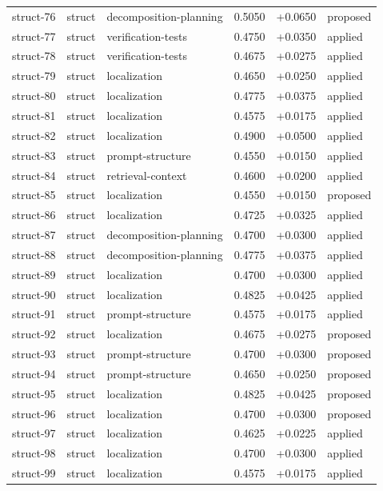 \begin{center}
\begin{longtable}{llp{5.2cm}rrl}
struct-76 & struct & decomposition-planning & 0.5050 & +0.0650 & proposed \\
struct-77 & struct & verification-tests & 0.4750 & +0.0350 & applied \\
struct-78 & struct & verification-tests & 0.4675 & +0.0275 & applied \\
struct-79 & struct & localization & 0.4650 & +0.0250 & applied \\
struct-80 & struct & localization & 0.4775 & +0.0375 & applied \\
struct-81 & struct & localization & 0.4575 & +0.0175 & applied \\
struct-82 & struct & localization & 0.4900 & +0.0500 & applied \\
struct-83 & struct & prompt-structure & 0.4550 & +0.0150 & applied \\
struct-84 & struct & retrieval-context & 0.4600 & +0.0200 & applied \\
struct-85 & struct & localization & 0.4550 & +0.0150 & proposed \\
struct-86 & struct & localization & 0.4725 & +0.0325 & applied \\
struct-87 & struct & decomposition-planning & 0.4700 & +0.0300 & applied \\
struct-88 & struct & decomposition-planning & 0.4775 & +0.0375 & applied \\
struct-89 & struct & localization & 0.4700 & +0.0300 & applied \\
struct-90 & struct & localization & 0.4825 & +0.0425 & applied \\
struct-91 & struct & prompt-structure & 0.4575 & +0.0175 & applied \\
struct-92 & struct & localization & 0.4675 & +0.0275 & proposed \\
struct-93 & struct & prompt-structure & 0.4700 & +0.0300 & proposed \\
struct-94 & struct & prompt-structure & 0.4650 & +0.0250 & proposed \\
struct-95 & struct & localization & 0.4825 & +0.0425 & proposed \\
struct-96 & struct & localization & 0.4700 & +0.0300 & proposed \\
struct-97 & struct & localization & 0.4625 & +0.0225 & applied \\
struct-98 & struct & localization & 0.4700 & +0.0300 & applied \\
struct-99 & struct & localization & 0.4575 & +0.0175 & applied \\

\end{longtable}
\end{center}
